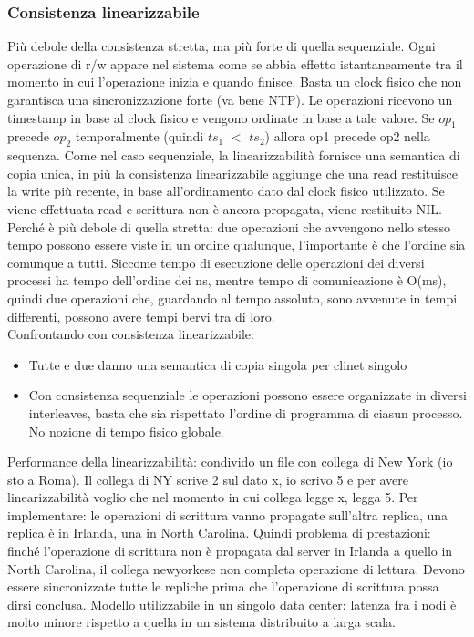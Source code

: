 \documentclass{article}
\begin{document}
\subsubsection{Consistenza linearizzabile}
Più debole della consistenza stretta, ma più forte di quella sequenziale. Ogni operazione di r/w appare nel sistema come se abbia effetto istantaneamente tra il momento in cui l'operazione inizia e quando finisce. Basta un clock fisico che non garantisca una sincronizzazione forte (va bene NTP).  Le operazioni ricevono un timestamp in base al clock fisico e vengono ordinate in base a tale valore. Se $op_1$ precede $op_2$ temporalmente (quindi $ts_1$ $<$ $ts_2$) allora op1 precede op2 nella sequenza. Come nel caso sequenziale, la linearizzabilità fornisce una semantica di copia unica, in più la consistenza linearizzabile aggiunge che una read restituisce la write più recente, in base all'ordinamento dato dal clock fisico utilizzato. Se viene effettuata read e scrittura non è ancora propagata, viene restituito NIL.\\ Perché è più debole di quella stretta: due operazioni che avvengono nello stesso tempo possono essere viste in un ordine qualunque, l'importante è che l'ordine sia comunque a tutti. Siccome tempo di esecuzione delle operazioni dei diversi processi ha tempo dell'ordine dei ns, mentre tempo di comunicazione è O(ms), quindi due operazioni che, guardando al tempo assoluto, sono avvenute in tempi differenti, possono avere tempi bervi tra di loro.\\ Confrontando con consistenza linearizzabile:
\begin{itemize}
\item Tutte e due danno una semantica di copia singola per clinet singolo
\item Con consistenza sequenziale le operazioni possono essere organizzate in diversi interleaves, basta che sia rispettato l'ordine di programma di ciasun processo. No nozione di tempo fisico globale.
\end{itemize}
Performance della linearizzabilità: condivido un file con collega di New York (io sto a Roma). Il collega di NY scrive 2 sul dato x, io scrivo 5 e per avere linearizzabilità voglio che nel momento in cui collega legge x, legga 5. Per implementare: le operazioni di scrittura vanno propagate sull'altra replica, una replica è in Irlanda, una in North Carolina. Quindi problema di prestazioni: finché l'operazione di scrittura non è propagata dal server in Irlanda a quello in North Carolina, il collega newyorkese non completa operazione di lettura. Devono essere sincronizzate tutte le repliche prima che l'operazione di scrittura possa dirsi conclusa. Modello utilizzabile in un singolo data center: latenza fra i nodi è molto minore rispetto a quella in un sistema distribuito a larga scala. 
\end{document}
